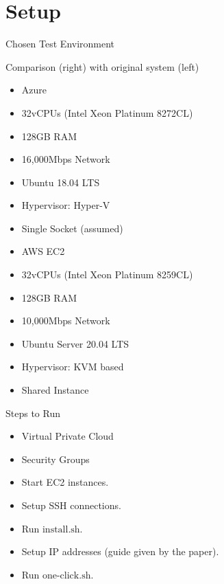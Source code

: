 \documentclass[xcolor=dvipsnames]{beamer}
\begin{document}
    

    \section{Setup}

    
    \begin{frame}{Chosen Test Environment}

        Comparison (right) with original system (left)
        \begin{multicols}{2}
            \begin{itemize}
                \item Azure
                \item 32vCPUs (Intel Xeon Platinum 8272CL) 
                \item 128GB RAM 
                \item 16,000Mbps Network
                \item Ubuntu 18.04 LTS
                \item Hypervisor: Hyper-V
                \item Single Socket (assumed)
                \item AWS EC2
                \item 32vCPUs (Intel Xeon Platinum 8259CL) 
                \item 128GB RAM
                \item 10,000Mbps Network 
                \item Ubuntu Server 20.04 LTS
                \item Hypervisor: KVM based
                \item Shared Instance
            \end{itemize}      
        \end{multicols}
    \end{frame}


    \begin{frame}{Steps to Run}

        \begin{itemize}
            \item Virtual Private Cloud 
            \item Security Groups 
            \item Start EC2 instances.
            \item Setup SSH connections. 
            \item Run $\text{install}.\text{sh}$.
            \item Setup IP addresses (guide given by the paper).
            \item Run $\text{one-click}.\text{sh}$.
        \end{itemize}

    \end{frame}
\end{document}
